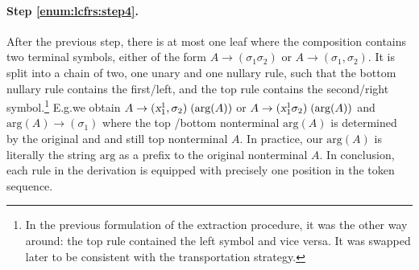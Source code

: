 \documentclass[../../document.tex]{subfiles}
\begin{document}


    \paragraph{Step \ref{enum:lcfrs:step4}.}
    After the previous step, there is at most one leaf where the  composition contains two terminal symbols, either of the form \(A \to (\sigma_1 \sigma_2)\) or \(A \to (\sigma_1, \sigma_2)\).
    It is split into a chain of two, one unary and one nullary rule, such that the bottom nullary rule contains the first/left, and the top rule contains the second/right symbol.\footnote{
        In the previous formulation of the extraction procedure, it was the other way around: the top rule contained the left symbol and vice versa.
        It was swapped later to be consistent with the transportation strategy.
    }
    E.g.\@ we obtain \(A \to (\textsl{x}_1^1, \sigma_2)\;(\text{arg}(A))\) or \(A \to (\textsl{x}_1^1 \sigma_2)\;(\text{arg}(A))\) and \(\text{arg}(A) \to (\sigma_1)\) where the top /bottom  nonterminal \(\text{arg}(A)\) is determined by the original and and still top  nonterminal \(A\).
    In practice, our \(\text{arg}(A)\) is literally the string \(\text{arg}\) as a prefix to the original nonterminal \(A\).
    In conclusion, each rule in the derivation is equipped with precisely one position in the token sequence.
\end{document}
